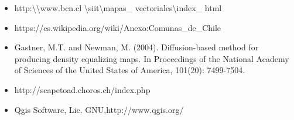 \documentclass[20pt]{report}
\begin{document}
\begin{itemize}
Finalmente se adjunta un archivo llamado cartograma.shp que contiene el cartograma de Chile por si  el lector desea revisarla, esto es posible mediante el programa QGIS $2.18.1$ de licencia gratuita. Adem\'as incluido va un archivo Deformation grid.shp el cual tiene la grilla  con la que se realiz\'o el cartograma de Chile. \\
El lector podr\'a realizar su propio cartograma con ScapeToad-v11 que tambi\'en est\'a incluido. Se recomienda  hacer un cartograma de baja calidad  debido al tiempo de ejecuci\'on.
\pagebreak

\section{Bibliografia}
\item http:\textbackslash \textbackslash  www.bcn.cl \textbackslash siit\textbackslash mapas\_ vectoriales\textbackslash index\_ html
\item https://es.wikipedia.org/wiki/Anexo:Comunas\_de\_Chile
\item Gastner, M.T. and Newman, M. (2004). Diffusion-based method for producing density equalizing maps. In Proceedings of the National Academy of Sciences of the United States of America, 101(20): 7499-7504.
\item http://scapetoad.choros.ch/index.php
\item Qgis Software, Lic. GNU,http://www.qgis.org/
\end{itemize}
\end{document}
